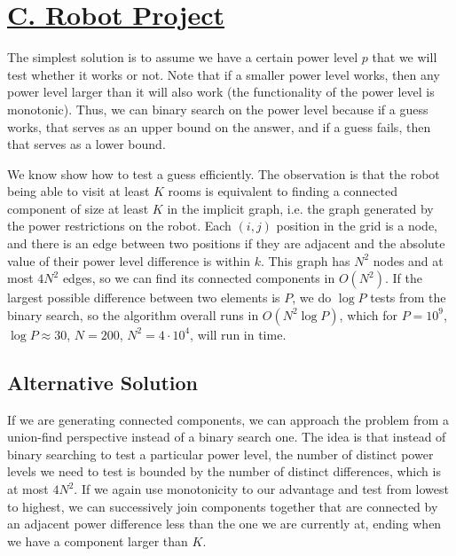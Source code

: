 \documentclass[11pt, oneside]{article}
\theoremstyle{plain}
\theoremstyle{definition}
\begin{document}
\section{\href{https://codeforces.com/group/M4wsRWBHyZ/contest/299371/problem/C}
{C. Robot Project}}
The simplest solution is to assume we have a certain power level \( p \) that
we will test whether it works or not. Note that if a smaller power level works,
then any power level larger than it will also work (the functionality of the
power level is monotonic). Thus, we can binary search on the power level
because if a guess works, that serves as an upper bound on the answer,
and if a guess fails, then that serves as a lower bound.

We know show how to test a guess efficiently. The observation is that the robot
being able to visit at least \( K \) rooms is equivalent to finding a 
connected component of size at least \( K  \) in the implicit graph,
i.e. the graph generated by the power restrictions on the robot.
Each \( (i, j) \) position in the grid is a node, and there is an edge
between two positions if they are adjacent and the absolute value of their
power level difference is within \( k \).
This graph has \( N^2 \) nodes and at most \( 4N^2 \) edges,
so we can find its connected components in \( O(N^2) \).
If the largest possible difference between two elements is \( P \),
we do \( \log P \) tests from the binary search, so the algorithm overall runs
in \( O(N^2 \log P) \), which for \( P = 10^9 \), \( \log P \approx 30 \),
\( N = 200 \), \( N^2 = 4 \cdot 10^4  \), will run in time.

\subsection{Alternative Solution}
If we are generating connected components, we can approach the problem
from a union-find perspective instead of a binary search one.
The idea is that instead of binary searching to test a particular power level,
the number of distinct power levels we need to test is bounded by the number
of distinct differences, which is at most \( 4N^2 \). If we again use
monotonicity to our advantage and test from lowest to highest, we can
successively join components together that are connected by an adjacent
power difference less than the one we are currently at, ending when we have a
component larger than \( K \).
\end{document}
